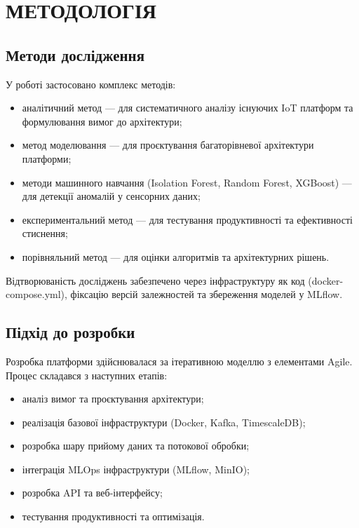 \chapter{МЕТОДОЛОГІЯ}

\section{Методи дослідження}

У роботі застосовано комплекс методів:

\begin{itemize}
    \item аналітичний метод --- для систематичного аналізу існуючих IoT платформ та формулювання вимог до архітектури;
    \item метод моделювання --- для проєктування багаторівневої архітектури платформи;
    \item методи машинного навчання (Isolation Forest, Random Forest, XGBoost) --- для детекції аномалій у сенсорних даних;
    \item експериментальний метод --- для тестування продуктивності та ефективності стиснення;
    \item порівняльний метод --- для оцінки алгоритмів та архітектурних рішень.
\end{itemize}

Відтворюваність досліджень забезпечено через інфраструктуру як код (docker-compose.yml), фіксацію версій залежностей та збереження моделей у MLflow.


\section{Підхід до розробки}

Розробка платформи здійснювалася за ітеративною моделлю з елементами Agile. Процес складався з наступних етапів:

\begin{itemize}
    \item аналіз вимог та проєктування архітектури;
    \item реалізація базової інфраструктури (Docker, Kafka, TimescaleDB);
    \item розробка шару прийому даних та потокової обробки;
    \item інтеграція MLOps інфраструктури (MLflow, MinIO);
    \item розробка API та веб-інтерфейсу;
    \item тестування продуктивності та оптимізація.
\end{itemize}

